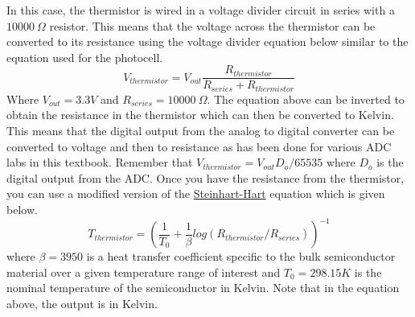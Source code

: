 {In this case, the thermistor is wired in a voltage divider circuit in series with a $10000~\Omega$ resistor. This means that the voltage across the thermistor can be converted to its resistance using the voltage divider equation below similar to the equation used for the photocell.
\begin{equation}
V_{thermistor} = V_{out}\frac{R_{thermistor}}{R_{series}+R_{thermistor}}
\end{equation}
Where $V_{out}=3.3V$ and $R_{series}=10000~\Omega$. The equation above can be inverted to obtain the resistance in the thermistor which can then be converted to Kelvin. This means that the digital output from the analog to digital converter can be converted to voltage and then to resistance as has been done for various ADC labs in this textbook. Remember that $V_{thermistor} = V_{out}D_o/65535$ where $D_o$ is the digital output from the ADC. Once you have the resistance from the thermistor, you can use a modified version of the \href{https://en.wikipedia.org/wiki/Steinhart%E2%80%93Hart_equation}{Steinhart-Hart} equation which is given below.
\begin{equation}
T_{thermistor}=\left(\frac{1}{T_0}+\frac{1}{\beta}log(R_{thermistor}/R_{series})\right)^{-1}
\end{equation}
where $\beta=3950$ is a heat transfer coefficient specific to the bulk semiconductor material over a given temperature range of interest and $T_0=298.15K$ is the nominal temperature of the semiconductor in Kelvin. Note that in the equation above, the output is in Kelvin.

}
